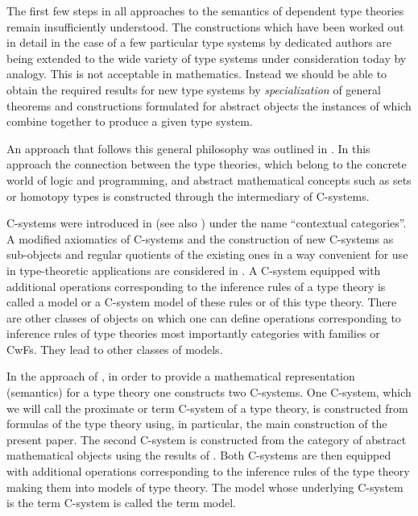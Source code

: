 \documentclass[11pt]{article}
\begin{document}
The first few steps in all approaches to the semantics of dependent type theories remain insufficiently understood. The constructions which have been worked out in detail in the case of a few particular type systems by dedicated authors are being extended to the wide variety of type systems under consideration today by analogy. This is not acceptable in mathematics. Instead we should be able to obtain the required results for new type systems by {\em specialization} of general theorems and constructions formulated for abstract objects the instances of which combine together to produce a given type system. 





An approach that follows this general philosophy was outlined in \cite{CMUtalk}. In this approach the connection between the type theories, which belong to the concrete world of logic and programming, and abstract mathematical concepts such as sets or homotopy types is constructed through the intermediary of C-systems. 

C-systems were introduced in \cite{Cartmell0} (see also \cite{Cartmell1}) under the name ``contextual categories''. A modified axiomatics of C-systems and the construction of new C-systems as sub-objects and regular quotients of the existing ones in a way convenient for use in type-theoretic applications are considered in \cite{Csubsystems}. A C-system equipped with additional operations corresponding to the inference rules of a type theory is called a model or a C-system model of these rules or of this type theory. There are other classes of objects on which one can define operations corresponding to inference rules of type theories most importantly categories with families or CwFs. They lead to other classes of models.  

In the approach of \cite{CMUtalk}, in order to provide a mathematical representation (semantics) for a type theory one constructs two C-systems. One C-system, which we will call the proximate or term C-system of a type theory, is constructed from formulas of the type theory using, in particular, the main  construction of the present paper.  The second C-system is constructed from the category of abstract mathematical objects using the results of \cite{Cfromauniverse}. Both C-systems are then equipped with additional operations corresponding to the inference rules of the type theory making them into models of type theory.  The model whose underlying C-system is the term C-system is called the term model. 
\end{document}
